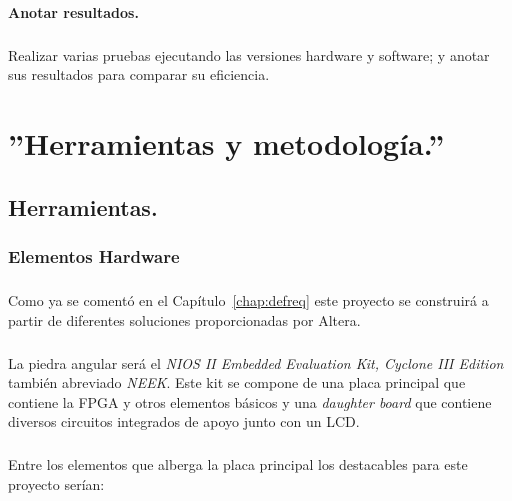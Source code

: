 \documentclass[a4paper,12pt,titlepage,final]{book}
\begin{document}
\subsubsection{Anotar resultados.}
\paragraph{}
Realizar varias pruebas ejecutando las versiones hardware y software; y anotar sus resultados para comparar su eficiencia.


\chapter{''Herramientas y metodología.''}

\section{Herramientas.}
\subsection{Elementos Hardware}
\subsubsection*{}

\paragraph{}
Como ya se comentó en el Capítulo~\ref{chap:defreq} este proyecto se construirá a partir de diferentes soluciones proporcionadas por Altera.

\paragraph{}
La piedra angular será el \textit{NIOS II Embedded Evaluation Kit, Cyclone III Edition} también abreviado \textit{NEEK}.
Este kit se compone de una placa principal que contiene la FPGA y otros
elementos básicos y una \textit{daughter board} que contiene diversos circuitos integrados
de apoyo junto con un LCD.

\paragraph{}
Entre los elementos que alberga la placa principal los destacables para este
proyecto serían:
\end{document}
